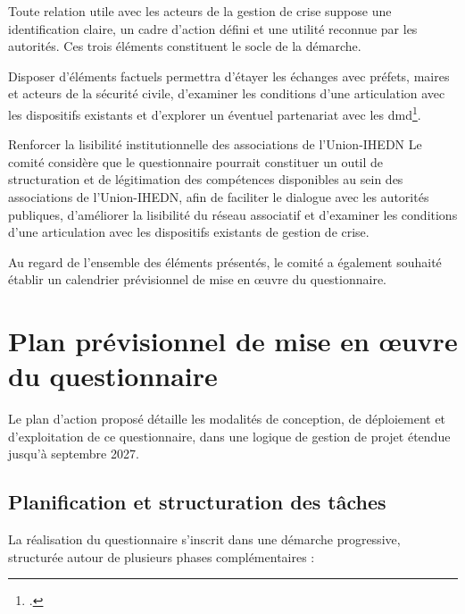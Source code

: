 \documentclass[12pt,a4paper]{article}
\newcommand{\UnionIHEDN}{Union-IHEDN}
\newcommand{\AssociationsUnionIHEDN}{associations de l'\UnionIHEDN}
\begin{document}
Toute relation utile avec les acteurs de la gestion de crise suppose une identification claire, un cadre d'action défini et une utilité reconnue par les autorités. Ces trois éléments constituent le socle de la démarche.

Disposer d'éléments factuels permettra d'étayer les échanges avec préfets, maires et acteurs de la sécurité civile, d'examiner les conditions d'une articulation avec les dispositifs existants et d'explorer un éventuel partenariat avec les \gls{dmd}\footcite{DMD_def_missions}.

\begin{proposition}{Renforcer la lisibilité institutionnelle des \AssociationsUnionIHEDN}
Le comité considère que le questionnaire pourrait constituer un outil de structuration et de légitimation des compétences disponibles au sein des \AssociationsUnionIHEDN, afin de faciliter le dialogue avec les autorités publiques, d'améliorer la lisibilité du réseau associatif et d'examiner les conditions d'une articulation avec les dispositifs existants de gestion de crise.
\end{proposition}

Au regard de l'ensemble des éléments présentés, le comité a également souhaité établir un calendrier prévisionnel de mise en \oe{}uvre du questionnaire.

\newpage

\section{Plan prévisionnel de mise en \oe{}uvre du questionnaire}

Le plan d'action proposé détaille les modalités de conception, de déploiement et d'exploitation de ce questionnaire, dans une logique de gestion de projet étendue jusqu'à septembre 2027.

\subsection{Planification et structuration des tâches}

La réalisation du questionnaire s'inscrit dans une démarche progressive, structurée autour de plusieurs phases complémentaires :
\end{document}
